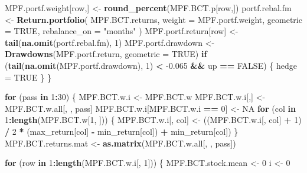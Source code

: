 \documentclass[]{article}
\newenvironment{Shaded}{\begin{snugshade}}{\end{snugshade}}
\newcommand{\ControlFlowTok}[1]{\textcolor[rgb]{0.13,0.29,0.53}{\textbf{#1}}}
\newcommand{\DataTypeTok}[1]{\textcolor[rgb]{0.13,0.29,0.53}{#1}}
\newcommand{\DecValTok}[1]{\textcolor[rgb]{0.00,0.00,0.81}{#1}}
\newcommand{\FloatTok}[1]{\textcolor[rgb]{0.00,0.00,0.81}{#1}}
\newcommand{\KeywordTok}[1]{\textcolor[rgb]{0.13,0.29,0.53}{\textbf{#1}}}
\newcommand{\NormalTok}[1]{#1}
\newcommand{\OperatorTok}[1]{\textcolor[rgb]{0.81,0.36,0.00}{\textbf{#1}}}
\newcommand{\OtherTok}[1]{\textcolor[rgb]{0.56,0.35,0.01}{#1}}
\newcommand{\StringTok}[1]{\textcolor[rgb]{0.31,0.60,0.02}{#1}}
\begin{document}
\begin{Shaded}
\begin{Highlighting}[]
\NormalTok{  MPF.portf.weight[row,] <-}\StringTok{ }\KeywordTok{round_percent}\NormalTok{(MPF.BCT.p[row,])}
\NormalTok{  portf.rebal.fm <-}
\StringTok{    }\KeywordTok{Return.portfolio}\NormalTok{(}
\NormalTok{      MPF.BCT.returns,}
      \DataTypeTok{weight =}\NormalTok{ MPF.portf.weight,}
      \DataTypeTok{geometric =} \OtherTok{TRUE}\NormalTok{,}
      \DataTypeTok{rebalance_on =} \StringTok{"months"}
\NormalTok{    )}
\NormalTok{  MPF.portf.return[row] <-}
\StringTok{    }\KeywordTok{tail}\NormalTok{(}\KeywordTok{na.omit}\NormalTok{(portf.rebal.fm), }\DecValTok{1}\NormalTok{)}
\NormalTok{  MPF.portf.drawdown <-}\StringTok{ }\KeywordTok{Drawdowns}\NormalTok{(MPF.portf.return,}
                                  \DataTypeTok{geometric =} \OtherTok{TRUE}\NormalTok{)}
  \ControlFlowTok{if}\NormalTok{ (}\KeywordTok{tail}\NormalTok{(}\KeywordTok{na.omit}\NormalTok{(MPF.portf.drawdown), }\DecValTok{1}\NormalTok{) }\OperatorTok{<}\StringTok{ }\FloatTok{-0.065} \OperatorTok{&&}
\StringTok{      }\NormalTok{up }\OperatorTok{==}\StringTok{ }\OtherTok{FALSE}\NormalTok{) \{}
\NormalTok{    hedge =}\StringTok{ }\OtherTok{TRUE}
\NormalTok{  \}}
\NormalTok{\}}

\ControlFlowTok{for}\NormalTok{ (pass }\ControlFlowTok{in} \DecValTok{1}\OperatorTok{:}\DecValTok{30}\NormalTok{) \{}
\NormalTok{  MPF.BCT.w.i <-}\StringTok{ }\NormalTok{MPF.BCT.w}
\NormalTok{  MPF.BCT.w.i[,] <-}\StringTok{ }\NormalTok{MPF.BCT.w.all[, , pass]}
\NormalTok{  MPF.BCT.w.i[MPF.BCT.w.i }\OperatorTok{==}\StringTok{ }\DecValTok{0}\NormalTok{] <-}\StringTok{ }\OtherTok{NA}
  \ControlFlowTok{for}\NormalTok{ (col }\ControlFlowTok{in} \DecValTok{1}\OperatorTok{:}\KeywordTok{length}\NormalTok{(MPF.BCT.w[}\DecValTok{1}\NormalTok{, ])) \{}
\NormalTok{    MPF.BCT.w.i[, col] <-}
\StringTok{      }\NormalTok{((MPF.BCT.w.i[, col] }\OperatorTok{+}\StringTok{ }\DecValTok{1}\NormalTok{) }\OperatorTok{/}\StringTok{ }\DecValTok{2} \OperatorTok{*}\StringTok{ }\NormalTok{(max_return[col] }\OperatorTok{-}\StringTok{ }\NormalTok{min_return[col]) }\OperatorTok{+}\StringTok{ }\NormalTok{min_return[col])}
\NormalTok{  \}}
\NormalTok{  MPF.BCT.returns.mat <-}\StringTok{ }\KeywordTok{as.matrix}\NormalTok{(MPF.BCT.w.all[, , pass])}
  
  \ControlFlowTok{for}\NormalTok{ (row }\ControlFlowTok{in} \DecValTok{1}\OperatorTok{:}\KeywordTok{length}\NormalTok{(MPF.BCT.w.i[, }\DecValTok{1}\NormalTok{])) \{}
\NormalTok{    MPF.BCT.stock.mean <-}\StringTok{ }\DecValTok{0}
\NormalTok{    i <-}\StringTok{ }\DecValTok{0}
    

\end{Highlighting}
\end{Shaded}
\end{document}
